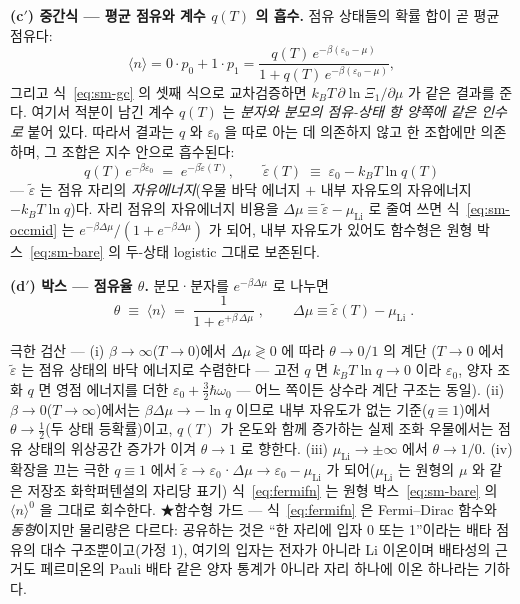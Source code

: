 \textbf{(c$'$) 중간식 --- 평균 점유와 계수 $q(T)$ 의 흡수.} 점유 상태들의 확률 합이 곧 평균 점유다:
\begin{equation}
\langle n\rangle=0\cdot p_0+1\cdot p_1
=\frac{q(T)\,e^{-\beta(\varepsilon_0-\mu)}}{1+q(T)\,e^{-\beta(\varepsilon_0-\mu)}},
\label{eq:sm-occmid}
\end{equation}
그리고 식~\eqref{eq:sm-gc} 의 셋째 식으로 교차검증하면 $k_BT\,\partial\ln\Xi_1/\partial\mu$ 가 같은
결과를 준다. 여기서 적분이 남긴 계수 $q(T)$ 는 \emph{분자와 분모의 점유-상태 항 양쪽에 같은 인수로}
붙어 있다. 따라서 결과는 $q$ 와 $\varepsilon_0$ 을 따로 아는 데 의존하지 않고 한 조합에만 의존하며,
그 조합은 지수 안으로 흡수된다:
\begin{equation}
q(T)\,e^{-\beta\varepsilon_0}\;=\;e^{-\beta\tilde\varepsilon(T)},
\qquad
\tilde\varepsilon(T)\;\equiv\;\varepsilon_0-k_BT\ln q(T)
\label{eq:sm-epstilde}
\end{equation}
--- $\tilde\varepsilon$ 는 점유 자리의 \emph{자유에너지}(우물 바닥 에너지 $+$ 내부 자유도의 자유에너지
$-k_BT\ln q$)다. 자리 점유의 자유에너지 비용을 $\Delta\mu\equiv\tilde\varepsilon-\mu_\mathrm{Li}$ 로
줄여 쓰면 식~\eqref{eq:sm-occmid} 는 $e^{-\beta\Delta\mu}/(1+e^{-\beta\Delta\mu})$ 가 되어, 내부
자유도가 있어도 함수형은 원형 박스~\eqref{eq:sm-bare} 의 두-상태 logistic 그대로 보존된다.

\textbf{(d$'$) 박스 --- 점유율 $\theta$.} 분모·분자를 $e^{-\beta\Delta\mu}$ 로 나누면
\begin{equation}
\boxed{\;\theta\;\equiv\;\langle n\rangle\;=\;\frac{1}{1+e^{+\beta\,\Delta\mu}}\;,
\qquad \Delta\mu\equiv\tilde\varepsilon(T)-\mu_\mathrm{Li}\;.}
\label{eq:fermifn}
\end{equation}
\begin{verifybox}
극한 검산 --- (i) $\beta\to\infty$($T\to0$)에서 $\Delta\mu\gtrless0$ 에 따라 $\theta\to0/1$ 의 계단
($T\to0$ 에서 $\tilde\varepsilon$ 는 점유 상태의 바닥 에너지로 수렴한다 --- 고전 $q$ 면 $k_BT\ln q\to0$
이라 $\varepsilon_0$, 양자 조화 $q$ 면 영점 에너지를 더한 $\varepsilon_0+\tfrac32\hbar\omega_0$ --- 어느
쪽이든 상수라 계단 구조는 동일). (ii) $\beta\to0$($T\to\infty$)에서는 $\beta\Delta\mu\to-\ln q$ 이므로
내부 자유도가 없는 기준($q\equiv1$)에서 $\theta\to\tfrac12$(두 상태 등확률)이고, $q(T)$ 가 온도와 함께
증가하는 실제 조화 우물에서는 점유 상태의 위상공간 증가가 이겨 $\theta\to1$ 로 향한다.
(iii) $\mu_\mathrm{Li}\to\pm\infty$ 에서 $\theta\to1/0$. (iv) 확장을 끄는 극한 $q\equiv1$ 에서
$\tilde\varepsilon\to\varepsilon_0$·$\Delta\mu\to\varepsilon_0-\mu_\mathrm{Li}$ 가 되어($\mu_\mathrm{Li}$ 는 원형의 $\mu$ 와
같은 저장조 화학퍼텐셜의 자리당 표기) 식~\eqref{eq:fermifn} 는 원형 박스~\eqref{eq:sm-bare} 의 $\langle n\rangle^{0}$ 을 그대로 회수한다.
★함수형 가드 --- 식~\eqref{eq:fermifn} 은 Fermi--Dirac 함수와 \emph{동형}이지만 물리량은 다르다:
공유하는 것은 ``한 자리에 입자 0 또는 1''이라는 배타 점유의 대수 구조뿐이고(가정 1), 여기의 입자는
전자가 아니라 Li 이온이며 배타성의 근거도 페르미온의 Pauli 배타 같은 양자 통계가 아니라 자리 하나에
이온 하나라는 기하다.
\end{verifybox}

